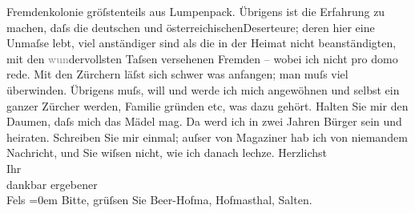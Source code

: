\begin{ledgroupsized}[t]{13cm}
                    Fremdenkolonie gröſstenteils aus Lumpenpack. Übrigens ist die Erfahrung zu
                    machen, daſs die deutschen und österreichischenDeserteure; deren hier eine Unmaſse
                    lebt, viel anständiger sind als die in der Heimat nicht beanständigten, mit den
                        \textcolor{gray}{wun}dervollsten Taſsen versehenen Fremden – wobei ich
                    nicht pro domo rede. Mit den Zürchern läſst
                    sich schwer was anfangen; man muſs viel überwinden. Übrigens muſs, will und
                    werde ich mich angewöhnen und selbst ein ganzer Zürcher werden, Familie gründen etc, was dazu gehört. Halten Sie mir
                    den Daumen, daſs mich das Mädel mag. Da{\geminationn} werd ich
                    in zwei Jahren Bürger \introOben{}sein\introOben{} und heiraten.\pend
           \pstart
           Schreiben Sie mir einmal; auſser von Magaziner hab ich von niemandem Nachricht, und Sie wiſsen nicht, wie
                    ich danach lechze.\pend
           \pstart
           Herzlichst{\\[\baselineskip]}Ihr{\\[\baselineskip]}dankbar ergebener{\\[\baselineskip]}\spacefill\mbox{Fels}\pend
           \leftskip=0em{}\pstart
           \noindent{}Bitte, grüſsen Sie Beer-Hofma{\geminationn}, Hofma{\geminationn}sthal, Salten.\pend
           \endnumbering{}\end{ledgroupsized}  \newcommand{\dateiname}{L00447}\newcommand{\titel}{Friedrich M. Fels an Arthur Schnitzler, [1. Hälfte Juni 1895]}\newcommand{\editorInnen}{Martin Anton Müller und Gerd-Hermann Susen}
      